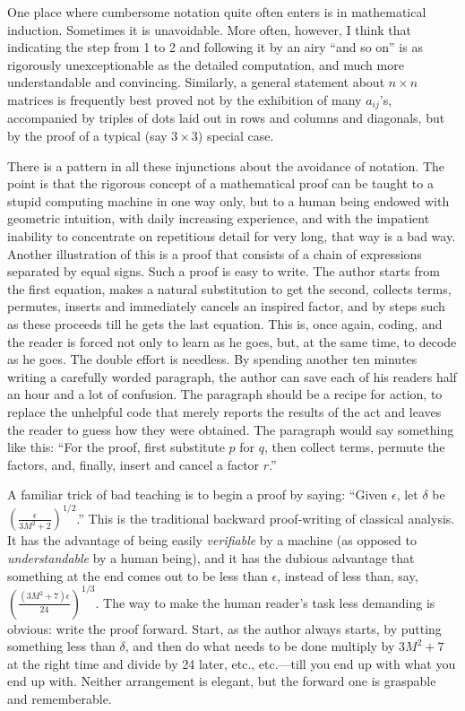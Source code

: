 \documentclass[12pt]{article}
\begin{document}
One place where cumbersome notation quite often enters is in mathematical induction. Sometimes it is unavoidable. More often, however, I think that indicating the step from 1 to 2 and following it by an airy ``and so on'' is as rigorously unexceptionable as the detailed computation, and much more understandable and convincing. Similarly, a general statement about $n \times n$ matrices is frequently best proved not by the exhibition of many $a_{ij}$'s, accompanied by triples of dots laid out in rows and columns and diagonals, but by the proof of a typical (say $3\times3$) special case. 

There is a pattern in all these injunctions about the avoidance of notation. The point is that the rigorous concept of a mathematical proof can be taught to a stupid computing machine in one way only, but to a human being endowed with geometric intuition, with daily increasing experience, and with the impatient inability to concentrate on repetitious detail for very long, that way is a bad way. Another illustration of this is a proof that consists of a chain of expressions separated by equal signs. Such a proof is easy to write. The author starts from the first equation, makes a natural substitution to get the second, collects terms, permutes, inserts and immediately cancels an inspired factor, and by steps such as these proceeds till he gets the last equation. This is, once again, coding, and the reader is forced not only to learn as he goes, but, at the same time, to decode as he goes. The double effort is needless. By spending another ten minutes writing a carefully worded paragraph, the author can save each of his readers half an hour and a lot of confusion. The paragraph should be a recipe for action, to replace the unhelpful code that merely reports the results of the act and leaves the reader to guess how they were obtained. The paragraph would say something like this: ``For the proof, first substitute $p$ for $q$, then collect terms, permute the factors, and, finally, insert and cancel a factor $r$.''

A familiar trick of bad teaching is to begin a proof by saying: ``Given $\epsilon$, let $\delta$ be $(\frac{\epsilon}{3M^{2}+2})^{1/2}$.'' This is the traditional backward proof-writing of classical analysis. It has the advantage of being easily \emph{verifiable} by a machine (as opposed to \emph{understandable} by a human being), and it has the dubious advantage that something at the end comes out to be less than $\epsilon$, instead of less than, say, $(\frac{(3M^{2}+7)\epsilon}{24})^{1/3}$. The way to make the human reader's task less demanding is obvious: write the proof forward. Start, as the author always starts, by putting something less than $\delta$, and then do what needs to be done multiply by $3M^{2}+7$ at the right time and divide by 24 later, etc., etc.---till you end up with what you end up with. Neither arrangement is elegant, but the forward one is graspable and rememberable.
\end{document}
